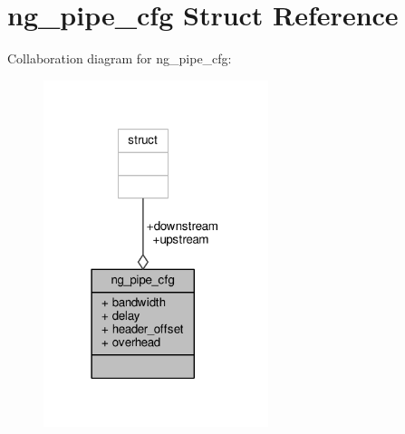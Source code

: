 \hypertarget{structng__pipe__cfg}{\section{ng\+\_\+pipe\+\_\+cfg Struct Reference}
\label{structng__pipe__cfg}
}


Collaboration diagram for ng\+\_\+pipe\+\_\+cfg\+:
\nopagebreak
\begin{figure}[H]
\begin{center}
\leavevmode
\includegraphics[width=186pt]{structng__pipe__cfg__coll__graph}
\end{center}
\end{figure}
